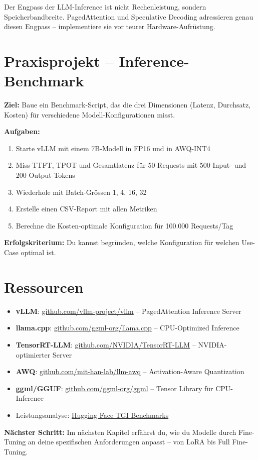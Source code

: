 \begin{merke}
Der Engpass der LLM-Inference ist nicht Rechenleistung, sondern Speicherbandbreite. PagedAttention und Speculative Decoding adressieren genau diesen Engpass -- implementiere sie vor teurer Hardware-Aufrüstung.
\end{merke}

\section{Praxisprojekt -- Inference-Benchmark}

\textbf{Ziel:} Baue ein Benchmark-Script, das die drei Dimensionen (Latenz, Durchsatz, Kosten) für verschiedene Modell-Konfigurationen misst.

\textbf{Aufgaben:}
\begin{enumerate}[leftmargin=*]
    \item Starte vLLM mit einem 7B-Modell in FP16 und in AWQ-INT4
    \item Miss TTFT, TPOT und Gesamtlatenz für 50 Requests mit 500 Input- und 200 Output-Tokens
    \item Wiederhole mit Batch-Grössen 1, 4, 16, 32
    \item Erstelle einen CSV-Report mit allen Metriken
    \item Berechne die Kosten-optimale Konfiguration für 100.000 Requests/Tag
\end{enumerate}

\textbf{Erfolgskriterium:} Du kannst begründen, welche Konfiguration für welchen Use-Case optimal ist.

\section{Ressourcen}

\begin{itemize}[leftmargin=*]
    \item \textbf{vLLM}: \href{https://github.com/vllm-project/vllm}{github.com/vllm-project/vllm} -- PagedAttention Inference Server
    \item \textbf{llama.cpp}: \href{https://github.com/ggml-org/llama.cpp}{github.com/ggml-org/llama.cpp} -- CPU-Optimized Inference
    \item \textbf{TensorRT-LLM}: \href{https://github.com/NVIDIA/TensorRT-LLM}{github.com/NVIDIA/TensorRT-LLM} -- NVIDIA-optimierter Server
    \item \textbf{AWQ}: \href{https://github.com/mit-han-lab/llm-awq}{github.com/mit-han-lab/llm-awq} -- Activation-Aware Quantization
    \item \textbf{ggml/GGUF}: \href{https://github.com/ggml-org/ggml}{github.com/ggml-org/ggml} -- Tensor Library für CPU-Inference
    \item Leistungsanalyse: \href{https://huggingface.co/spaces/optimum/text-generation-inference-benchmarks}{Hugging Face TGI Benchmarks}
\end{itemize}

\textbf{Nächster Schritt:} Im nächsten Kapitel erfährst du, wie du Modelle durch Fine-Tuning an deine spezifischen Anforderungen anpasst -- von LoRA bis Full Fine-Tuning.
